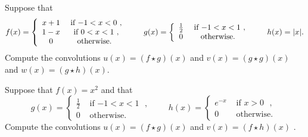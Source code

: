 \documentclass[11pt]{article}
\begin{document}

\begin{exercise}
    Suppose that
    \begin{align*}
        f(x) = \left\{\begin{array}{cc} x+1 & \text{ if $-1 < x < 0$ }, \\  1-x & \text{ if $ 0 < x < 1$ }, \\  0 & \text{ otherwise. } \end{array}\right.
        \qquad 
        g(x) = \left\{\begin{array}{cc} \frac 1 2 & \text{ if $-1 < x < 1$ }, \\ 0 & \text{ otherwise. } \end{array}\right.
        \qquad 
        h(x) = |x|
        .
    \end{align*}
    Compute the convolutions $u(x) = (f \star g)(x)$ and $v(x) = (g \star g)(x)$ and $w(x) = (g \star h)(x)$.
\end{exercise}
\begin{solution} 
\end{solution}



\begin{exercise}
    Suppose that $f(x) = x^2$ and that
    \[
        g(x) = \left\{\begin{array}{cc} \frac 1 2 & \text{ if $-1 < x < 1$ }, \\ 0 & \text{ otherwise. } \end{array}\right.
        \qquad 
        h(x) = \left\{\begin{array}{cc} e^{-x} & \text{ if $x > 0$ }, \\ 0 & \text{ otherwise. } \end{array}\right.
    \]
    Compute the convolutions $u(x) = (f \star g)(x)$ and $v(x) = (f \star h)(x)$ .
\end{exercise}

\begin{solution}     
\end{solution}
\end{document}
